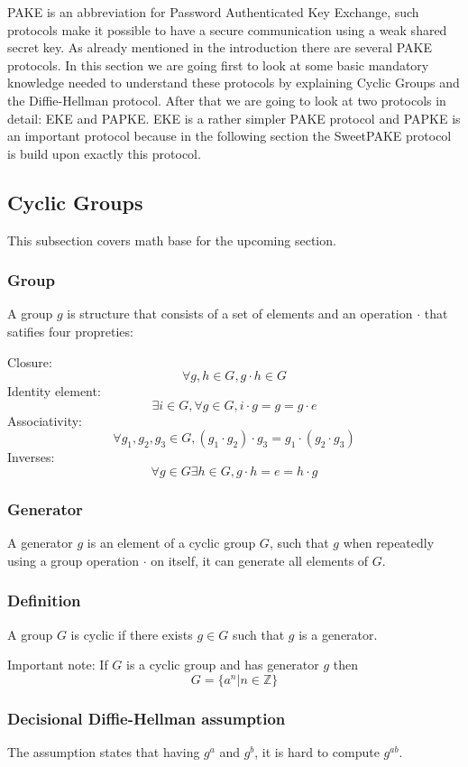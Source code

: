 \documentclass[../main.tex]{subfiles}
\begin{document}
PAKE is an abbreviation for Password Authenticated Key Exchange, such protocols
make it possible to have a secure communication using a weak shared secret key.
As already mentioned in the introduction there are several PAKE protocols. In
this section we are going first to look at some basic mandatory knowledge
needed to understand these protocols by explaining Cyclic Groups and the
Diffie-Hellman protocol. After that we are going to look at two protocols in
detail: EKE and PAPKE. EKE is a rather simpler PAKE protocol and PAPKE is an
important protocol because in the following section the SweetPAKE protocol is
build upon exactly this protocol.

\subsection{Cyclic Groups}
This subsection covers math base for the upcoming section.

\subsubsection{Group}
A group \(g\) is structure that consists of a set of elements and an operation \(\cdot\)
that satifies four propreties: 

Closure: \[\forall g, h \in G,  g \cdot h \in G\]
Identity element: \[\exists i \in G, \forall g \in G, i \cdot g = g =
g \cdot e\]
Associativity: \[\forall g_1, g_2, g_3 \in G, (g_1 \cdot g_2) \cdot g_3 = g_1
\cdot (g_2 \cdot g_3)\]
Inverses:\[\forall g \in G \exists h \in G, g \cdot h = e = h \cdot g\]

\subsubsection{Generator}
A generator \(g\) is an element of a cyclic group \(G\), such that \(g\) when repeatedly using
a group operation \(\cdot\) on itself, it can generate all elements of \(G\).

\subsubsection{Definition} A group \(G\) is cyclic if there exists \(g \in G\)
such that \(g\) is a generator.

Important note: If \(G\) is a cyclic group and has generator \(g\) then \[G =
\{a^n | n \in \mathbb{Z}\}\]

\subsubsection{Decisional Diffie-Hellman assumption}
The assumption states that having \(g^{a}\) and \(g^{b}\), it is hard to compute \(g^{ab}\).
\end{document}
